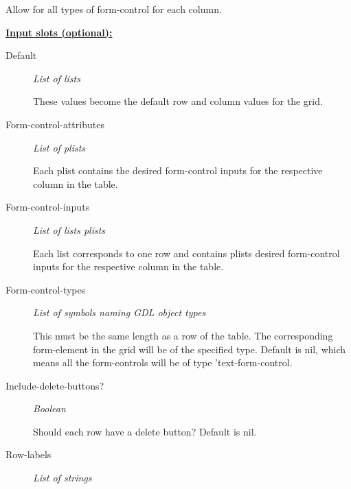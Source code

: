 \documentclass [11pt]{book}
\begin{document}
\begin{itemize}
\begin{description}
Allow for all types of form-control for each column.





\end{description}








\textbf{
\underline{Input slots (optional):}}

\begin{description}

\item [Default]
\emph{List of lists}

 These values become the default row and column
values for the grid.




\item [Form-control-attributes]
\emph{List of plists}

 Each plist contains the desired form-control
inputs for the respective column in the table.




\item [Form-control-inputs]
\emph{List of lists plists}

 Each list corresponds to one row
and contains plists desired form-control inputs for the
respective column in the table.




\item [Form-control-types]
\emph{List of symbols naming GDL object types}

 This must be
the same length as a row of the table. The corresponding
form-element in the grid will be of the specified type.
Default is nil, which means all the form-controls will
be of type 'text-form-control.




\item [Include-delete-buttons?]
\emph{Boolean}

 Should each row have a delete button?
Default is nil.




\item [Row-labels]
\emph{List of strings}


\end{description}
\end{itemize}
\end{document}
